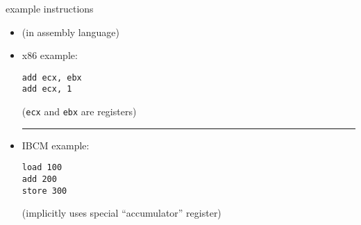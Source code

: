 \begin{frame}[fragile,label=exampleInstrs]{example instructions}
\begin{itemize}
    \item {\small (in assembly language)}
\item x86 example: \\
\begin{lstlisting}[language=myasm]
add ecx, ebx
add ecx, 1
\end{lstlisting}
        {\small ({\tt ecx} and {\tt ebx} are registers)}
\hrule
\item IBCM example: \\
\begin{lstlisting}[language=myasm]
load 100
add 200
store 300
\end{lstlisting}
        {\small (implicitly uses special ``accumulator'' register)}
\end{itemize}
\end{frame}
